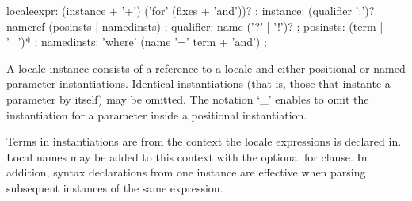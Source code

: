 \begin{isabellebody}
\begin{isamarkuptext}
  \begin{rail}
    localeexpr: (instance + '+') ('for' (fixes + 'and'))?
    ;
    instance: (qualifier ':')? nameref (posinsts | namedinsts)
    ;
    qualifier: name ('?' | '!')?
    ;
    posinsts: (term | '_')*
    ;
    namedinsts: 'where' (name '=' term + 'and')
    ;
  \end{rail}

  A locale instance consists of a reference to a locale and either
  positional or named parameter instantiations.  Identical
  instantiations (that is, those that instante a parameter by itself)
  may be omitted.  The notation `\_' enables to omit the instantiation
  for a parameter inside a positional instantiation.

  Terms in instantiations are from the context the locale expressions
  is declared in.  Local names may be added to this context with the
  optional for clause.  In addition, syntax declarations from one
  instance are effective when parsing subsequent instances of the same
  expression.


\end{isamarkuptext}
\end{isabellebody}
